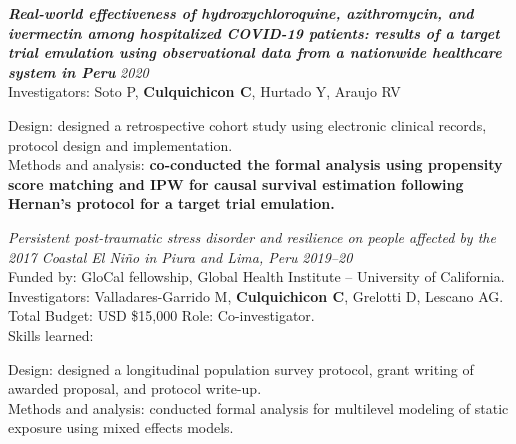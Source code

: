 \documentclass[10pt]{article}
\newenvironment{outerlist}[1][\enskip\textbullet]%
{\begin{itemize}[#1]}{\end{itemize}%
	\vspace{-0.6\baselineskip}}
\newenvironment{innerlist}[1][\enskip$\circ$]%
{\begin{compactitem}[#1]}{\end{compactitem}}
\begin{document}
\vspace{-0.10in}
\begin{outerlist}
	\item[] \textbf{\emph{Real-world effectiveness of hydroxychloroquine, azithromycin, and ivermectin among hospitalized COVID-19 patients: results of a target trial emulation using observational data from a nationwide healthcare system in Peru}}  \hfill {\it 2020}\\
	Investigators: Soto P, {\bf Culquichicon C}, Hurtado Y, Araujo RV \\ 
	\vspace{-0.20in}
	
	\begin{innerlist}
		\item[] 	Design: designed a retrospective cohort study using electronic clinical records, protocol design and implementation. \\
					Methods and analysis: {\bf co-conducted the formal analysis using propensity score matching and IPW for causal survival estimation following Hernan's protocol for a target trial emulation.}\\
	\end{innerlist}
	
\end{outerlist}


\vspace{-0.25in}
\begin{outerlist}
	\item[] {\it Persistent post-traumatic stress disorder and resilience on people affected by the 2017 Coastal El Niño in Piura and Lima, Peru} \hfill {\it 2019--20}\\
	Funded by: GloCal fellowship, Global Health Institute -- University of California.\\
	Investigators: Valladares-Garrido M, {\bf Culquichicon C}, Grelotti D, Lescano AG. \\
	Total Budget: USD \$15,000 \hfill Role: Co-investigator.\\
	Skills learned:
	\begin{innerlist}
		\item[] 	Design: designed a longitudinal population survey protocol, grant writing of awarded proposal, and protocol write-up. \\
					Methods and analysis: conducted formal analysis for multilevel modeling of static exposure using mixed effects models. \\
	\end{innerlist}
	
	
\end{outerlist}
\end{document}
